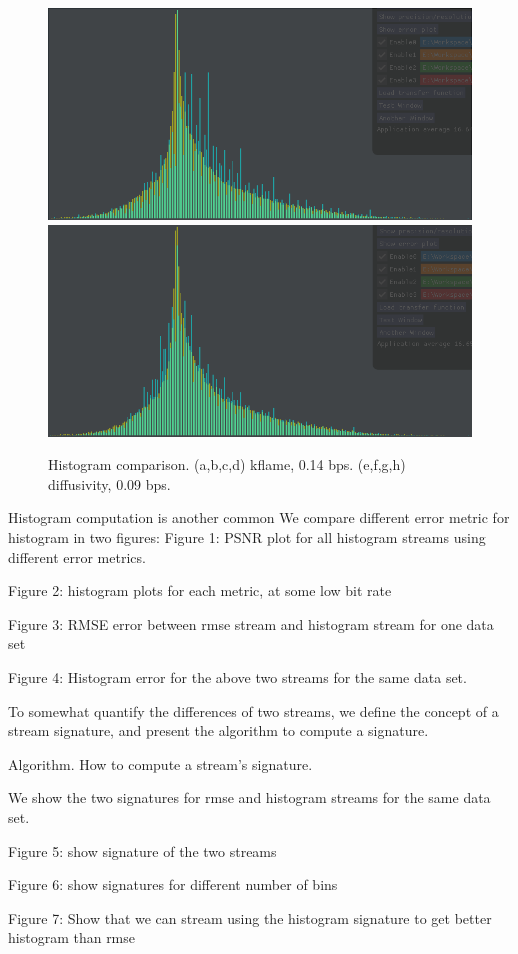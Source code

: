 \begin{figure}
	{\includegraphics[width=0.48\linewidth]{img/histogram/diffusivity/wavenorm.png}}
	{\includegraphics[width=0.48\linewidth]{img/histogram/diffusivity/signature.png}}
	\caption{Histogram comparison. (a,b,c,d) kflame, 0.14 bps. (e,f,g,h) diffusivity, 0.09 bps.}
	\label{fig:histogram-comparison-low-bit-rate}
\end{figure}

Histogram computation is another common 
We compare different error metric for histogram in two figures:
Figure 1: PSNR plot for all histogram streams using different error metrics.

Figure 2: histogram plots for each metric, at some low bit rate

Figure 3: RMSE error between rmse stream and histogram stream for one data set

Figure 4: Histogram error for the  above two streams for the same data set.

To somewhat quantify the differences of two streams, we define the concept of a stream signature, and present the algorithm to compute a signature.

Algorithm. How to compute a stream's signature.

We show the two signatures for rmse and histogram streams for the same data set.

Figure 5: show signature of the two streams

Figure 6: show signatures for different number of bins

Figure 7: Show that we can stream using the histogram signature to get better histogram than rmse